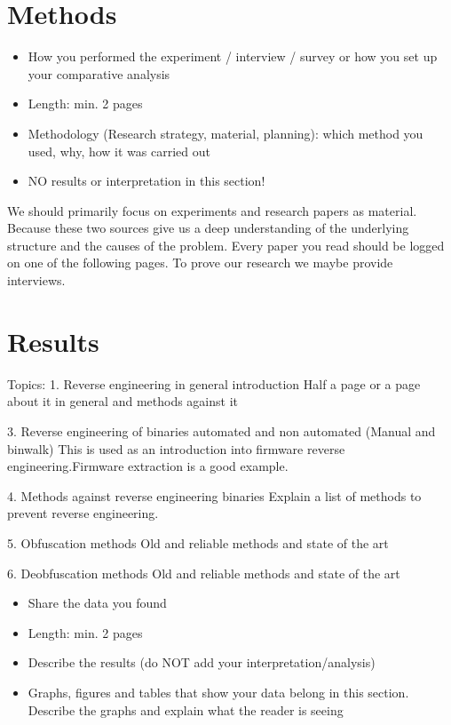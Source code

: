\documentclass[]{report}
\begin{document}
\section{Methods}
\begin{itemize}
	\item How you performed the experiment / interview / survey or how you set up your comparative analysis
	\item Length: min. 2 pages
	\item Methodology (Research strategy, material, planning): which method you used, why, how it was carried out
	\item NO results or interpretation in this section!
\end{itemize}

We should primarily focus on experiments and research papers as material. Because these two sources give us a deep understanding of the underlying structure and the causes of the problem. Every paper you read should be logged on one of the following pages. To prove our research we maybe provide interviews.

\section{Results}

Topics:
1. Reverse engineering in general introduction 
	Half a page or a page about it in general and methods against it
	
3. Reverse engineering of binaries automated and non automated (Manual and binwalk)
	This is used as an introduction into firmware reverse engineering.Firmware extraction is a good example.

4. Methods against reverse engineering binaries
	Explain a list of methods to prevent reverse engineering.
	
5. Obfuscation methods 
	Old and reliable methods and state of the art
	
6. Deobfuscation methods
	Old and reliable methods and state of the art


\begin{itemize}
	\item Share the data you found
	\item Length: min. 2 pages
	\item Describe the results (do NOT add your interpretation/analysis)
	\item Graphs, figures and tables that show your data belong in this section. Describe the graphs and explain what the reader is seeing

\end{itemize}
\end{document}
